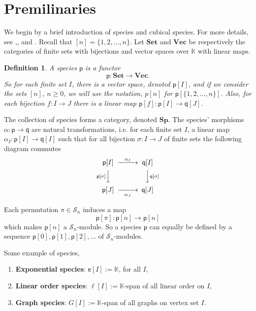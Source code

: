 \documentclass[11pt,reqno]{amsart}
\numberwithin{equation}{section}
\newtheorem{definition}[theorem]{Definition}
\def\K{{\mathbb K}}
\def\Sp{{\mathbf{Sp}}}
\def\Set{{\mathbf{Set}}}
\def\Vec{{\mathbf{Vec}}}
\def\p{{\textsf{p}}}
\def\q{{\textsf{q}}}
\def\exp{{\textsf{e}}}
\def\id{\mathrm{id}}
\def\Sn{\mathbf{\mathcal{S}}_n}
\begin{document}
\section{Premilinaries}
We begin by a brief introduction of species and cubical species. For more details, see \cite{Aguiar},\cite{BLL}, \cite{Joyal} and \cite{HLL}. Recall that $[n]=\{1,2,\dots,n\}$. Let $\Set$ and $\Vec$ be respectively the categories of finite sets with bijections and vector spaces over $\K$ with linear maps. 

\begin{definition}
A species $\p$ is a functor 
$$\p\colon\Set\rightarrow \Vec.$$
So for each finite set $I$, there is a vector space, denoted $\p[I]$, and if we consider the sets $[n]$, $n\geq 0$, we will use the notation, $p[n]$ for $\p[\{1,2,\dots,n\}]$. Also, for each bijection $f:I\rightarrow J$ there is a linear map $\p[f]\colon\p[I]\rightarrow \q[J]$.
\end{definition}


The collection of species forms a category, denoted $\Sp$. The species' morphisms $\alpha\colon\p\rightarrow \q$ are natural transformations, i.e. for each finite set $I$, a linear map $\alpha_I\colon\p[I]\rightarrow \q[I]$ such that for all bijection $\sigma\colon I\rightarrow J$ of finite sets the following diagram commutes
\begin{equation}
\begin{CD}
\p[I] @>\alpha_I>> \q[I]\\
@V\p[\sigma] VV  @VV\q[\sigma] V\\
\p[J] @>>\alpha_J> \q[J]
\end{CD}
\end{equation}


Each permutation $\pi\in \Sn$ induces a map
$$\p[\pi]\colon\p[n]\rightarrow \p[n]$$
which makes $\p[n]$ a $\Sn$-module. So a species $\p$ can equally be defined by a sequence $\p[0],\p[1],\p[2],\dots$ of $\Sn$-modules.

Some example of species,
\begin{enumerate}
\item {\bf Exponential species}: $\exp[I]:=\K$, for all $I$,
\item {\bf Linear order species}: $\ell[I]:=\K$-span of all linear order on $I$,
\item {\bf Graph species}: $G[I]:= \K$-span of all graphs on vertex set $I$.
\end{enumerate}
\end{document}
